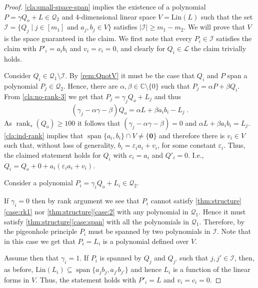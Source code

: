 \documentclass[10pt,a4paper]{article}
\def\rank{\operatorname{rank}}
\renewcommand{\vec}[1]{{\mathbf{#1}}}
\renewcommand{\C}{\mathbb{C}}
\newcommand{\cI}{{\mathcal{I}}}
\newcommand{\calL}{{\mathcal{L}}}
\newcommand{\cQ}{{\mathcal{Q}}}
\newcommand{\spn}[1]{\operatorname{span}\{{#1}\}}
\def\epsilon{\varepsilon}
\newcommand{\rkq}{100}
\newcommand{\MS}{\text{Lin}}
\begin{document}
\begin{proof}
 \autoref{cla:small-space-span} implies the existence of a polynomial $P = \gamma Q_o +  L \in \cQ_2$ and $4$-dimensional linear space $V=\MS(L)$ such that the set
$\cI = \lbrace Q_j\mid j\in [m_1]\text{ and }a_j,b_j \in V\rbrace$ satisfies  $\vert \cI \vert \geq m_1-m_2$. We will prove that $V$ is the space guaranteed in the claim. We first note that every $P_i \in \cI$ satisfies the claim with $P'_i = a_ib_i$ and $v_i=c_i =0$, and clearly for
$Q_i \in \calL$ the claim trivially holds.


Consider $Q_i \in \cQ_1 \setminus \cI$. By \autoref{rem:QnotV} it must be the case that $Q_i$ and $P$ span a polynomial $P_j \in \cQ_2$. Hence, there are $\alpha,\beta \in \C\setminus \{0\}$ such that $P_j = \alpha P + \beta Q_i$. From \autoref{cla:no-rank-3} we get that $P_j = \gamma_j Q_o + L_j$ and thus
 \[(\gamma_j -\alpha \gamma-\beta)Q_o = \alpha L + \beta a_ib_i - L_j \;.\]
As $\rank_s(Q_o) \geq \rkq$ it follows that $(\gamma_j -\alpha \gamma-\beta) = 0$ and $\alpha L + \beta a_ib_i = L_j$.  \autoref{cla:ind-rank} implies that $\spn{a_i,b_i} \cap V \neq \{\vec{0}\}$ and therefore there is $v_i\in V$ such that, without loss of generality, $b_i = \epsilon_i a_i + v_i$, for some constant $\epsilon_i$. Thus, the claimed statement holds for $Q_i$ with $c_i = a_i$ and $Q'_i = 0$. I.e., $Q_i = Q_o + 0+ a_i(\epsilon_i a_i + v_i )$.
 
Consider a polynomial $P_i=\gamma_iQ_o+L_i\in\cQ_2$.

If $\gamma_i=0$ then by rank argument we see that $P_i$ cannot satisfy  \autoref{thm:structure}\ref{case:rk1} nor  \autoref{thm:structure}\ref{case:2} with any polynomial in $\cQ_1$. Hence it must satisfy \autoref{thm:structure}\ref{case:span} with all the polynomials in $\cQ_1$. Therefore, by the pigeonhole principle $P_i$ must be spanned by two polynomials in $\cI$. Note that in this case we get that $P_i = L_i$ is a polynomial defined over $V$.


Assume then that $\gamma_i=1$. If  $P_i$ is spanned by $Q_j$ and $Q_{j'}$ such that  $j,j'\in \cI$, then, as before, $\MS(L_i) \subseteq \spn{a_jb_j , a_{j'}b_{j'}}$ and hence $L_i$ is a function of the linear forms in $V$. Thus, the statement holds with $P'_i = L$ and $v_i=c_i =0$. 



\end{proof}
\end{document}
